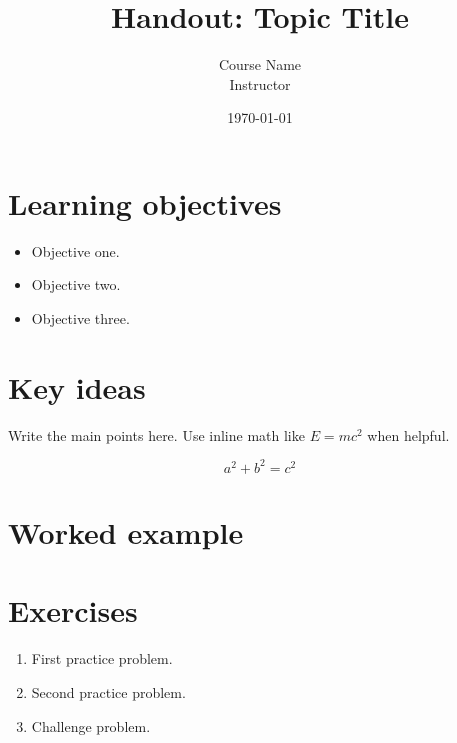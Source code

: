 \documentclass[11pt]{article}
\title{Handout: Topic Title}
\author{Course Name \\ Instructor}
\date{\today}
\begin{document}
\maketitle

\section*{Learning objectives}
\begin{itemize}[leftmargin=*]
  \item Objective one.
  \item Objective two.
  \item Objective three.
\end{itemize}

\section{Key ideas}
Write the main points here. Use inline math like $E = mc^2$ when helpful.

\begin{equation}
  a^2 + b^2 = c^2
\end{equation}

\section{Worked example}

\section{Exercises}
\begin{enumerate}[leftmargin=*]
  \item First practice problem.
  \item Second practice problem.
  \item Challenge problem.
\end{enumerate}
\end{document}
